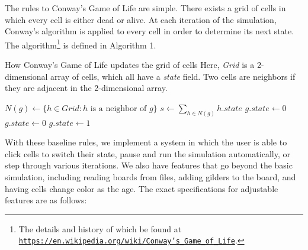 \documentclass[onecolumn,12pt]{IEEEtran}
\begin{document}
  The rules to Conway's Game of Life are simple. There exists a grid of cells in
  which every cell is either dead or alive. At each iteration of the simulation,
  Conway's algorithm is applied to every cell in order to determine its next
  state. The algorithm\footnote{The details and history of which be found at
      \href{https://en.wikipedia.org/wiki/Conway's\_Game\_of\_Life}{\texttt{https://en.wikipedia.org/wiki/Conway's\_Game\_of\_Life}}.}
is defined in Algorithm 1.%

  \begin{algorithm}[t]
      \caption{How Conway's Game of Life updates the grid of cells
          Here, \textit{Grid} is a 2-dimensional array of cells, which all have
          a \textit{state} field. Two cells are neighbors if they are adjacent
      in the 2-dimensional array.}
      \begin{algorithmic}
          \State $N(g) \gets \{ h \in \textit{Grid} : \textrm{$h$ is a neighbor
          of $g$}\}$
          \State $s \gets \sum_{h \in N(g)} h.\textit{state}$
          \State $g.\textit{state} \gets 0$
          \Else
          \State $g.\textit{state} \gets 0$
          \Else 
          \State $g.\textit{state} \gets 1$
          \EndIf
          \EndIf
          \EndFor
          \EndFunction
      \end{algorithmic}
      \label{alg:update}
  \end{algorithm}

  With these baseline rules, we implement a system in which the user is able to
  click cells to switch their state, pause and run the simulation
  automatically, or step through various iterations. We also have features that
  go beyond the basic simulation, including reading boards from files, adding
  gilders to the board, and having cells change color as the age. The exact
  specifications for adjustable features are as follows:
\end{document}
